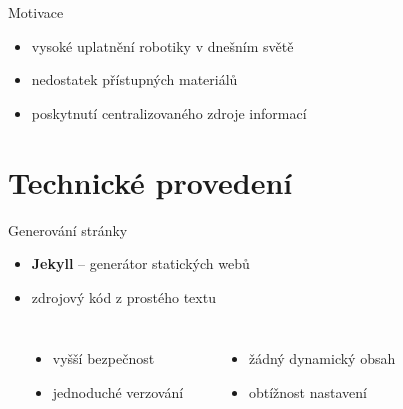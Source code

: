 \documentclass[14pt, hyperref={unicode}]{beamer}
\title{\makebox[\linewidth]{Robotika jednoduše}}
\date{\today}
\author{Tomáš Sláma}
\institute{Gymnázium Turnov}
\newcommand{\Plus}{\fixfaIcon{Plus}}
\newcommand{\Minus}{\fixfaIcon{Minus}}
\begin{document}
  \maketitle

  \begin{frame}{Motivace}
    \pause
    \begin{itemize}[<+->]
      \item vysoké uplatnění robotiky v dnešním světě
      \item nedostatek přístupných materiálů
      \item poskytnutí centralizovaného zdroje informací
    \end{itemize}
  \end{frame}

  \section{Technické provedení}

  \begin{frame}{Generování stránky}
    \pause
    \begin{itemize}[<+->]
      \item \textbf{Jekyll} -- generátor statických webů
      \item zdrojový kód z prostého textu
    \end{itemize}

    \vspace{\baselineskip}

    \begin{columns}[b, onlytextwidth]
      \setlength\topsep{0pt}
      \small
        \begin{center}
          \large
          \Plus
        \end{center}
        \begin{itemize}[<+->]
          \itemsep0em
          \item vyšší bezpečnost
          \item jednoduché verzování
        \end{itemize}
        \begin{center}
          \large
          \Minus
        \end{center}
        \begin{itemize}[<+->]
          \itemsep0em
          \item žádný dynamický obsah
          \item obtížnost nastavení
        \end{itemize}
    \end{columns}
  \end{frame}
\end{document}
